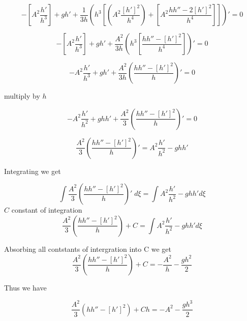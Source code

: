 \documentclass[subeqn]{article}
\begin{document}
\begin{equation*}
-\left[A^2 \frac{h'}{h^3}\right]  + gh'  + \frac{1}{3h} \left({h^3}\left[\left(A^2 \frac{\left[h'\right]^2}{h^4} \right) + \left[A^2 \frac{h h'' - 2\left[h'\right]^2}{h^4}\right] \right]\right)' = 0 
\end{equation*}

\begin{equation*}
-\left[A^2 \frac{h'}{h^3}\right]  + gh'  + \frac{A^2}{3h} \left({h^3}\left[\frac{h h'' - \left[h'\right]^2}{h^4} \right]\right)' = 0 
\end{equation*}

\begin{equation*}
-A^2 \frac{h'}{h^3}  + gh'  + \frac{A^2}{3h} \left(\frac{h h'' - \left[h'\right]^2}{h} \right)' = 0 
\end{equation*}

multiply by $h$

\begin{equation*}
-A^2 \frac{h'}{h^2}  + ghh'  + \frac{A^2}{3} \left(\frac{h h'' - \left[h'\right]^2}{h} \right)' = 0 
\end{equation*}

\begin{equation*}
\frac{A^2}{3} \left(\frac{h h'' - \left[h'\right]^2}{h} \right)' = A^2 \frac{h'}{h^2} - ghh'
\end{equation*}

Integrating we get

\begin{equation*}
\int \frac{A^2}{3} \left(\frac{h h'' - \left[h'\right]^2}{h} \right)' \; d \xi =  \int A^2 \frac{h'}{h^2} - ghh'  d \xi
\end{equation*}
$C$ constant of integration
\begin{equation*}
 \frac{A^2}{3} \left(\frac{h h'' - \left[h'\right]^2}{h} \right) + C  =  \int A^2 \frac{h'}{h^2} - ghh'  d \xi
\end{equation*}

Absorbing all contstants of intergration into C we get
\begin{equation*}
\frac{A^2}{3} \left(\frac{h h'' - \left[h'\right]^2}{h} \right) + C  =  -\frac{A^2}{h} - \frac{gh^2}{2}
\end{equation*}

Thus we have

\begin{equation*}
\frac{A^2}{3} \left({h h'' - \left[h'\right]^2} \right) + Ch  =  -{A^2} - \frac{gh^3}{2}
\end{equation*}
\end{document}
